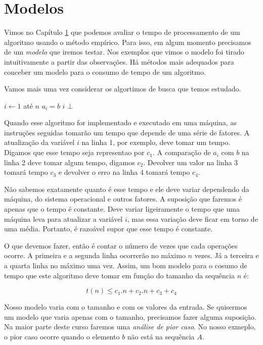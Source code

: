 \chapter{Modelos}

Vimos no Capítulo \ref{} que podemos avaliar o tempo de processamento de um algoritmo usando o método empírico.
Para isso, em algum momento precisamos de um {\em modelo} que iremos testar.
Nos exemplos que vimos o modelo foi tirado intuitivamente a partir das observações.
Há métodos mais adequados para conceber um modelo para o consumo de tempo de um algoritmo.

Vamos mais uma vez considerar os algortimos de busca que temos estudado.

\begin{codebox}
\li \For $i \gets 1$ até $n$
\li \Do \If $a_i = b$
\li     \Then \Return $i$
        \End
    \End
\li \Return $\bot$
\End
\end{codebox}

Quando esse algoritmo for implementado e executado em uma máquina, as instruções seguidas tomarão um tempo que depende de uma série de fatores.
A atualização da variável $i$ na linha 1, por exemplo, deve tomar um tempo.
Digamos que esse tempo seja representao por $c_1$.
A comparação de $a_i$ com $b$ na linha 2 deve tomar algum tempo, digamos $c_2$.
Devolver um valor na linha 3 tomará tempo $c_3$ e devolver o erro na linha 4 tomará tempo $c_4$.

Não sabemos exatamente quanto é esse tempo e ele deve variar dependendo da máquina, do sistema operacional e outros fatores.
A suposição que faremos é apenas que o tempo é constante.
Deve variar ligeiramente o tempo que uma máquina leva para atualizar a variável $i$, mas essa variação deve ficar em torno de uma média.
Portanto, é razoável supor que esse tempo é constante.

O que devemos fazer, então é contar o número de vezes que cada operações ocorre.
A primeira e a segunda linha ocorrerão no máximo $n$ vezes.
Já a terceira e a quarta linha no máximo uma vez.
Assim, um bom modelo para o cosumo de tempo que este algoritmo deve tomar em função do tamanho da sequência $n$ é:

\begin{displaymath}
  t(n) \leq c_1.n + c_2.n + c_3 + c_4 
\end{displaymath}

Nosso modelo varia com o tamanho e com os valores da entrada.
Se quisermos um modelo que varia apenas com o tamanho, precisamos fazer alguma suposição.
Na maior parte deste curso faremos uma {\em análise de pior caso}.
No nosso exmeplo, o pior caso ocorre quando o elemento $b$ não está na sequência $A$.

